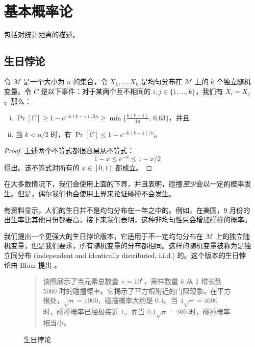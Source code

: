 \chapter{基本概率论}\label{chap:B}

包括对统计距离的描述。

\section{生日悖论}\label{sec:B-1}

\begin{theorem}\label{theo:B-1}
令 $\mathcal{M}$ 是一个大小为 $n$ 的集合，令 $X_1,\dots,X_k$ 是均匀分布在 $\mathcal{M}$ 上的 $k$ 个独立随机变量。令 $C$ 是以下事件：对于某两个互不相同的 $i,j\in\{1,\dots,k\}$，我们有 $X_i=X_j$。那么：
\begin{enumerate}[(i)]
	\item $\displaystyle \Pr[C]\geq 1-e^{-k(k-1)/2n}\geq\min\bigg\{\frac{k(k-1)}{4n},\,0.63\bigg\}$，并且
	\item 当 $k<n/2$ 时，有 $\Pr[C]\leq 1-e^{-k(k-1)/n}$。
\end{enumerate}
\end{theorem}

\begin{proof}
上述两个不等式都很容易从不等式：
\[
1-x\leq e^{-x}\leq 1-x/2
\]
得出。该不等式对所有的 $x\in[0,1]$ 都成立。
\end{proof}

在大多数情况下，我们会使用上面的下界，并且表明，碰撞\emph{至少}会以一定的概率发生。但是，偶尔我们也会使用上界来论证碰撞不会发生。

有资料显示，人们的生日并不是均匀分布在一年之中的。例如，在美国，$9$ 月份的出生率比其他月份都要高。接下来我们表明，这种非均匀性只会增加碰撞的概率。

我们提出一个更强大的生日悖论版本，它适用于不一定均匀分布在 $\mathcal{M}$ 上的独立随机变量，但是我们要求，所有随机变量的分布都相同。这样的随机变量被称为是独立同分布 (independent and identically distributed, i.i.d.) 的。这个版本的生日悖论由 Blom 提出 \cite{bloom1973birthday}。

\begin{figure}
  \centering
  
  \begin{quote}
  {\small 该图展示了当元素总数量 $n=10^6$，采样数量 $k$ 从 $1$ 增长到 $5000$ 时的碰撞概率。它揭示了平方根附近的门限现象。在平方根处，$\sqrt{n}=1000$，碰撞概率大约是 $0.4$。当 $4\sqrt{n}=4000$ 时，碰撞概率已经极接近 $1$。而当 $0.4\sqrt{n}=500$ 时，碰撞概率相当小。}
  \end{quote}
  \caption{生日悖论}
  \label{fig:B-1}
\end{figure}

